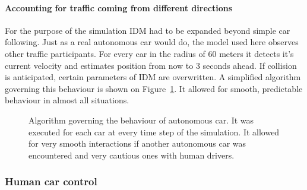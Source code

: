 \documentclass[11pt,english]{article}
\begin{document}
\paragraph{Accounting for traffic coming from different directions} For the purpose of the simulation IDM had to be expanded beyond simple car following. Just as a real autonomous car would do, the model used here observes other traffic participants. For every car in the radius of 60 meters it detects it's current velocity and estimates position from now to 3 seconds ahead. 
If collision is anticipated, certain parameters of IDM are overwritten. A simplified algorithm governing this behaviour is shown on Figure~\ref{fig:idm_upgrade}. It allowed for smooth, predictable behaviour in almost all situations. 


\begin{figure}[!] %
\caption{Algorithm governing the behaviour of autonomous car. It was executed for each car at every time step of the simulation. It allowed for very smooth interactions if another autonomous car was encountered and very cautious ones with human drivers.}
\label{fig:idm_upgrade}
\end{figure} 


\subsubsection{Human car control}
\end{document}
